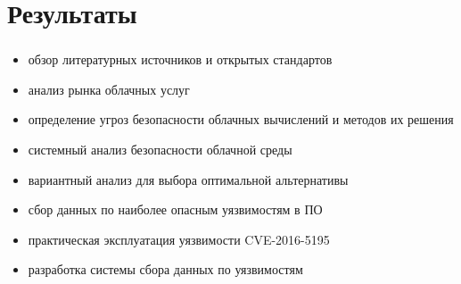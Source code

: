 
\section{Результаты}

\begin{frame}
\frametitle{\insertsection}

\begin{itemize}
    \item обзор литературных источников и открытых стандартов
    \item анализ рынка облачных услуг
    \item определение угроз безопасности облачных вычислений и методов их решения
    \item системный анализ безопасности облачной среды
    \item вариантный анализ для выбора оптимальной альтернативы
    \item сбор данных по наиболее опасным уязвимостям в ПО
    \item практическая эксплуатация уязвимости CVE-2016-5195
    \item разработка системы сбора данных по уязвимостям
\end{itemize}
\end{frame}


